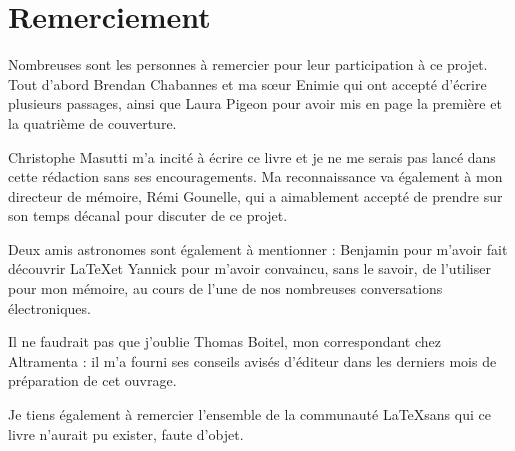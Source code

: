 \section*{Remerciement}\thispagestyle{plain}

Nombreuses sont les personnes à remercier pour leur participation à ce projet. Tout d'abord Brendan Chabannes et ma sœur Enimie qui ont accepté d'écrire plusieurs passages, ainsi que Laura Pigeon pour avoir mis en page la première et la quatrième de couverture.

Christophe Masutti m'a incité à écrire ce livre et je ne me serais pas lancé dans cette rédaction sans ses encouragements. Ma reconnaissance va également à mon directeur de mémoire, Rémi Gounelle, qui a aimablement accepté de prendre sur son temps décanal pour discuter de ce projet.

Deux amis astronomes sont également à mentionner : Benjamin pour m'avoir fait découvrir  \LaTeX et Yannick pour m'avoir convaincu, sans le savoir, de l'utiliser pour mon mémoire, au cours de l'une de nos nombreuses conversations électroniques.

Il ne faudrait pas que j'oublie Thomas Boitel, mon correspondant chez Altramenta : il m'a fourni ses conseils avisés d'éditeur dans les derniers mois de préparation de cet ouvrage.

Je tiens également à remercier l'ensemble de la communauté \LaTeX sans qui ce livre n'aurait pu exister, faute d'objet. 

